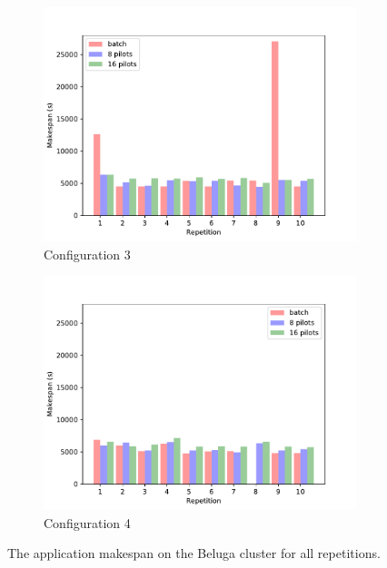 \begin{figure}
\begin{subfigure}[b]{0.475\textwidth}
		\centering
		\includegraphics[width=\textwidth]{figures/part2-chp2/dedicated_3_beluga}
		\caption[]%
		{{\small Configuration 3}}
		\label{fig:beluga3}
	    \end{subfigure}
	    \quad
	    \begin{subfigure}[b]{0.475\textwidth}
		\centering
		\includegraphics[width=\textwidth]{figures/part2-chp2/dedicated_4_beluga}
		\caption[]%
		{{\small Configuration 4}}
		\label{fig:beluga4}
	    \end{subfigure}
	    \caption{\small The application makespan on the Beluga cluster for all repetitions.}
	    \label{fig:makespansbeluga}
	\end{figure}
    
